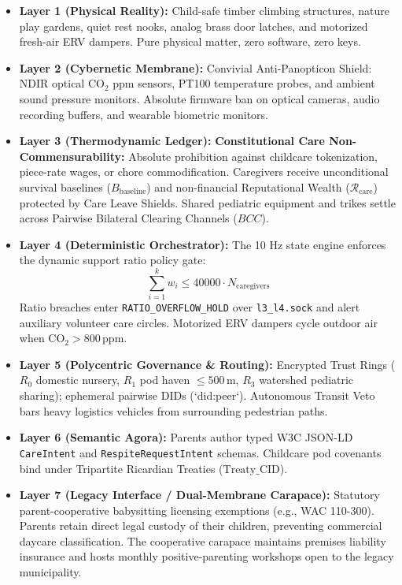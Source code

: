 \begin{itemize}
    \item \textbf{Layer 1 (Physical Reality):} Child-safe timber climbing structures, nature play gardens, quiet rest nooks, analog brass door latches, and motorized fresh-air ERV dampers. Pure physical matter, zero software, zero keys.
    \item \textbf{Layer 2 (Cybernetic Membrane):} Convivial Anti-Panopticon Shield: NDIR optical $\text{CO}_2$ ppm sensors, PT100 temperature probes, and ambient sound pressure monitors. Absolute firmware ban on optical cameras, audio recording buffers, and wearable biometric monitors.
    \item \textbf{Layer 3 (Thermodynamic Ledger):} \textbf{Constitutional Care Non-Commensurability:} Absolute prohibition against childcare tokenization, piece-rate wages, or chore commodification. Caregivers receive unconditional survival baselines ($B_{\mathrm{baseline}}$) and non-financial Reputational Wealth ($\mathcal{R}_{\mathrm{care}}$) protected by Care Leave Shields. Shared pediatric equipment and trikes settle across Pairwise Bilateral Clearing Channels ($BCC$).
    \item \textbf{Layer 4 (Deterministic Orchestrator):} The 10 Hz state engine enforces the dynamic support ratio policy gate:
    \[
    \sum_{i=1}^{k} w_i \le 40000 \cdot N_{\mathrm{caregivers}}
    \]
    Ratio breaches enter \texttt{RATIO\_OVERFLOW\_HOLD} over \texttt{l3\_l4.sock} and alert auxiliary volunteer care circles. Motorized ERV dampers cycle outdoor air when $\text{CO}_2 > 800\,\mathrm{ppm}$.
    \item \textbf{Layer 5 (Polycentric Governance \& Routing):} Encrypted Trust Rings ($R_0$ domestic nursery, $R_1$ pod haven $\le 500\,\mathrm{m}$, $R_3$ watershed pediatric sharing); ephemeral pairwise DIDs (`did:peer`). Autonomous Transit Veto bars heavy logistics vehicles from surrounding pedestrian paths.
    \item \textbf{Layer 6 (Semantic Agora):} Parents author typed W3C JSON-LD \texttt{CareIntent} and \texttt{RespiteRequestIntent} schemas. Childcare pod covenants bind under Tripartite Ricardian Treaties ($\mathrm{Treaty\_CID}$).
    \item \textbf{Layer 7 (Legacy Interface / Dual-Membrane Carapace):} Statutory parent-cooperative babysitting licensing exemptions (e.g., WAC 110-300). Parents retain direct legal custody of their children, preventing commercial daycare classification. The cooperative carapace maintains premises liability insurance and hosts monthly positive-parenting workshops open to the legacy municipality.
\end{itemize}

